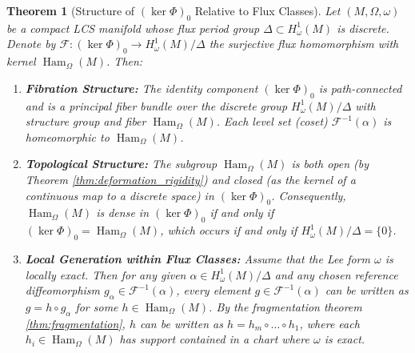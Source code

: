 \documentclass[11pt,a4paper]{amsart}
\newtheorem{theorem}{Theorem}[section]
\theoremstyle{definition}
\theoremstyle{remark}
\newcommand{\Ham}{\operatorname{Ham}}
\begin{document}
	\begin{theorem}[Structure of $(\ker \Phi)_0$ Relative to Flux Classes] \label{thm:structure_ker_phi}
		Let $(M, \Omega, \omega)$ be a compact LCS manifold whose flux period group $\Delta \subset H_\omega^1(M)$ is discrete. Denote by $\mathcal{F} : (\ker \Phi)_0 \longrightarrow H_\omega^1(M)/\Delta$ the surjective flux homomorphism with kernel $\Ham_\Omega(M)$. Then:
		\begin{enumerate}
			\item \textbf{Fibration Structure:} The identity component $(\ker \Phi)_0$ is path-connected and is a principal fiber bundle over the discrete group $H_\omega^1(M)/\Delta$ with structure group and fiber $\Ham_\Omega(M)$. Each level set (coset) $\mathcal{F}^{-1}(\alpha)$ is homeomorphic to $\Ham_\Omega(M)$.
			\item \textbf{Topological Structure:} The subgroup $\Ham_\Omega(M)$ is both open (by Theorem \ref{thm:deformation_rigidity}) and closed (as the kernel of a continuous map to a discrete space) in $(\ker \Phi)_0$. Consequently, $\Ham_\Omega(M)$ is dense in $(\ker \Phi)_0$ if and only if $(\ker \Phi)_0 = \Ham_\Omega(M)$, which occurs if and only if $H_\omega^1(M)/\Delta = \{0\}$.
			\item \textbf{Local Generation within Flux Classes:} Assume that the Lee form $\omega$ is locally exact. Then for any given $\alpha \in H_\omega^1(M)/\Delta$ and any chosen reference diffeomorphism $g_\alpha \in \mathcal{F}^{-1}(\alpha)$, every element $g \in \mathcal{F}^{-1}(\alpha)$ can be written as $g = h \circ g_\alpha$ for some $h \in \Ham_\Omega(M)$. By the fragmentation theorem \ref{thm:fragmentation}, $h$ can be written as $h = h_m \circ \dots \circ h_1$, where each $h_i \in \Ham_\Omega(M)$ has support contained in a chart where $\omega$ is exact.
		\end{enumerate}
	\end{theorem}
	
\end{document}
